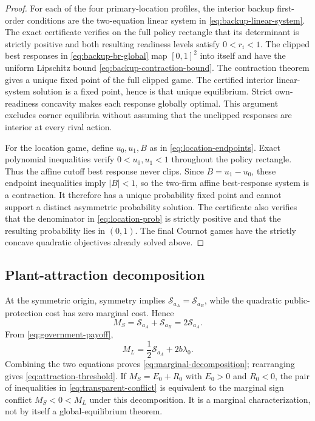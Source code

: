 \begin{proof}
For each of the four primary-location profiles, the interior backup first-order conditions are the two-equation linear system in \eqref{eq:backup-linear-system}. The exact certificate verifies on the full policy rectangle that its determinant is strictly positive and both resulting readiness levels satisfy $0<r_i<1$. The clipped best responses in \eqref{eq:backup-br-global} map $[0,1]^2$ into itself and have the uniform Lipschitz bound \eqref{eq:backup-contraction-bound}. The contraction theorem gives a unique fixed point of the full clipped game. The certified interior linear-system solution is a fixed point, hence is that unique equilibrium. Strict own-readiness concavity makes each response globally optimal. This argument excludes corner equilibria without assuming that the unclipped responses are interior at every rival action.

For the location game, define $u_0,u_1,B$ as in \eqref{eq:location-endpoints}. Exact polynomial inequalities verify $0<u_0,u_1<1$ throughout the policy rectangle. Thus the affine cutoff best response never clips. Since $B=u_1-u_0$, these endpoint inequalities imply $|B|<1$, so the two-firm affine best-response system is a contraction. It therefore has a unique probability fixed point and cannot support a distinct asymmetric probability solution. The certificate also verifies that the denominator in \eqref{eq:location-prob} is strictly positive and that the resulting probability lies in $(0,1)$. The final Cournot games have the strictly concave quadratic objectives already solved above.
\end{proof}

\subsection{Plant-attraction decomposition}

At the symmetric origin, symmetry implies $\mathcal S_{a_A}=\mathcal S_{a_B}$, while the quadratic public-protection cost has zero marginal cost. Hence
\begin{equation}
M_S=\mathcal S_{a_A}+\mathcal S_{a_B}=2\mathcal S_{a_A}.
\end{equation}
From \eqref{eq:government-payoff},
\begin{equation}
M_L=\frac12\mathcal S_{a_A}+2b\lambda_0.
\end{equation}
Combining the two equations proves \eqref{eq:marginal-decomposition}; rearranging gives \eqref{eq:attraction-threshold}. If $M_S=E_0+R_0$ with $E_0>0$ and $R_0<0$, the pair of inequalities in \eqref{eq:transparent-conflict} is equivalent to the marginal sign conflict $M_S<0<M_L$ under this decomposition. It is a marginal characterization, not by itself a global-equilibrium theorem.

